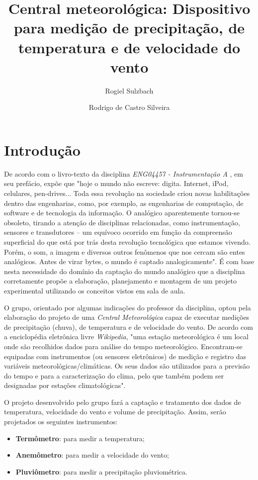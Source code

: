 \documentclass[a4paper]{instrumentacao}
\title{Central meteorológica: Dispositivo para medição de precipitação, de temperatura e de velocidade do vento}
\author{Rogiel Sulzbach \and Rodrigo de Castro Silveira}
\institute{Universidade Federal do Rio Grande do Sul, Departamento de Engenharia Elétrica, Curso de Engenharia Elétrica, Instrumentação A, Prof. Dr. Alexandre Balbinot}
\begin{document}
\fontsize{12pt}{16pt}\selectfont
\maketitle

\chapter{Introdução}
De acordo com o livro-texto da disciplina \textit{ENG04457 - Instrumentação A} \cite{livro-texto}, em seu prefácio, expõe que "hoje o mundo não escreve: digita. Internet, iPod, celulares, pen-drives... Toda essa revolução na sociedade criou novas habilitações dentro das engenharias, como, por exemplo, as engenharias de computação, de software e de tecnologia da informação. O analógico aparentemente tornou-se obsoleto, tirando a atenção de disciplinas relacionadas, como instrumentação, sensores e transdutores -- um equívoco ocorrido em função da compreensão superficial do que está por trás desta revolução tecnológica que estamos vivendo. Porém, o som, a imagem e diversos outros fenômenos que nos cercam são entes analógicos. Antes de virar bytes, o mundo é captado analogicamente". É com base nesta necessidade do domínio da captação do mundo analógico que a disciplina corretamente propõe a elaboração, planejamento e montagem de um projeto experimental utilizando os conceitos vistos em sala de aula.

O grupo, orientado por algumas indicações do professor da disciplina, optou pela elaboração do projeto de uma \textit{Central Meteorológica} capaz de executar medições de precipitação (chuva), de temperatura e de velocidade do vento. De acordo com a enciclopédia eletrônica livre \textit{Wikipedia}\cite{estacao}, "uma estação meteorológica é um local onde são recolhidos dados para análise do tempo meteorológico. Encontram-se equipadas com instrumentos (ou sensores eletrônicos) de medição e registro das variáveis meteorológicas/climáticas. Os seus dados são utilizados para a previsão do tempo e para a caracterização do clima, pelo que também podem ser designadas por estações climatológicas".

O projeto desenvolvido pelo grupo fará a captação e tratamento dos dados de temperatura, velocidade do vento e volume de precipitação. Assim, serão projetados os seguintes instrumentos:

\begin{itemize}
	\item \textbf{Termômetro}: para medir a temperatura;
	\item \textbf{Anemômetro}: para medir a velocidade do vento;
	\item \textbf{Pluviômetro}: para medir a precipitação pluviométrica.
\end{itemize}
\end{document}
